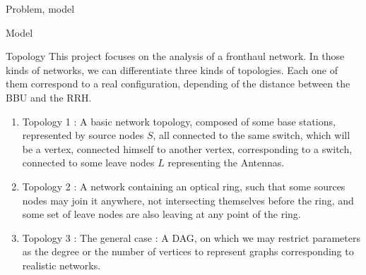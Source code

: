 \documentclass[a4paper,10pt]{report}
\begin{document}
\begin{chapter}{Problem, model}
\begin{section}{Model}
\begin{subsection}{Topology}
This project focuses on the analysis of a fronthaul network. In those kinds of networks, we can differentiate three kinds of
topologies. Each one of them correspond to a real configuration, depending of the distance between the BBU and the RRH.
\begin{enumerate}
 \item Topology 1 : A basic network topology, composed of some base stations, represented by source nodes $S$, all connected to the same switch,
which will be a vertex, connected himself to another vertex, corresponding to a switch, connected to some leave nodes $L$ representing the Antennas.
\item Topology 2 : A network containing an optical ring, such that some sources nodes may join it anywhere, not intersecting themselves before the ring,
and some set of leave nodes are also leaving at any point of the ring.
\item Topology 3 : The general case : A DAG, on which we may restrict parameters as the degree or the number of vertices to represent graphs corresponding to realistic networks.
\end{enumerate}
\\


\end{subsection}
\end{section}
\end{chapter}
\end{document}
